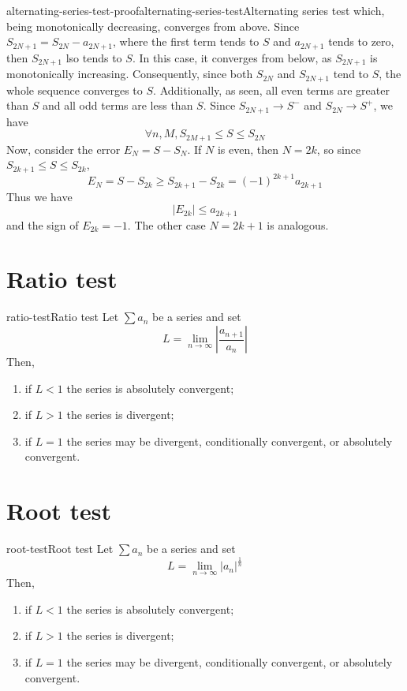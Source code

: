 \documentclass[preview]{standalone}
\begin{document}
\begin{snippetproof}{alternating-series-test-proof}{alternating-series-test}{Alternating series test}
    which, being monotonically decreasing, converges from above.
    Since \(S_{2N + 1} = S_{2N} - a_{2N + 1}\), where the first term tends to \(S\) and \(a_{2N+1}\) tends to zero,
    then \(S_{2N+1}\) lso tends to \(S\). In this case, it converges from below, as \(S_{2N+1}\) is monotonically increasing.
    Consequently, since both \(S_{2N}\) and \(S_{2N+1}\) tend to \(S\), the whole sequence converges to \(S\).
    Additionally, as seen, all even terms are greater than \(S\) and all odd terms are less than \(S\).
    Since \(S_{2N+1} \to S^-\) and \(S_{2N} \to S^+\), we have
    \[
        \forall n, M, S_{2M+1} \leq S \leq S_{2N}
    \]
    Now, consider the error \(E_N = S - S_N\).
    If \(N\) is even, then \(N=2k\), so since \(S_{2k+1} \leq S \leq S_{2k}\),
    \[E_N = S - S_{2k} \geq S_{2k + 1} - S_{2k} = {(-1)}^{2k+1} a_{2k+1}\]
    Thus we have
    \[
        |E_{2k}| \leq a_{2k+1}
    \]
    and the sign of \(E_{2k} = -1\).
    The other case \(N=2k+1\) is analogous.
\end{snippetproof}

\section{Ratio test}

\begin{snippettheorem}{ratio-test}{Ratio test}
    Let \(\sum a_n\) be a series and set
    \[
        L = \lim_{n \to \infty} \left| \frac{a_{n+1}}{a_n} \right|
    \]
    Then,
    \begin{enumerate}
        \item if \(L < 1\) the series is absolutely convergent;
        \item if \(L > 1\) the series is divergent;
        \item if \(L = 1\) the series may be divergent, conditionally convergent, or absolutely convergent.
    \end{enumerate}
\end{snippettheorem}

\section{Root test}

\begin{snippettheorem}{root-test}{Root test}
    Let \(\sum a_n\) be a series and set
    \[
        L = \lim_{n \to \infty} {|a_n|}^{\frac{1}{n}}
    \]
    Then,
    \begin{enumerate}
        \item if \(L < 1\) the series is absolutely convergent;
        \item if \(L > 1\) the series is divergent;
        \item if \(L = 1\) the series may be divergent, conditionally convergent, or absolutely convergent.
    \end{enumerate}
\end{snippettheorem}
\end{document}
